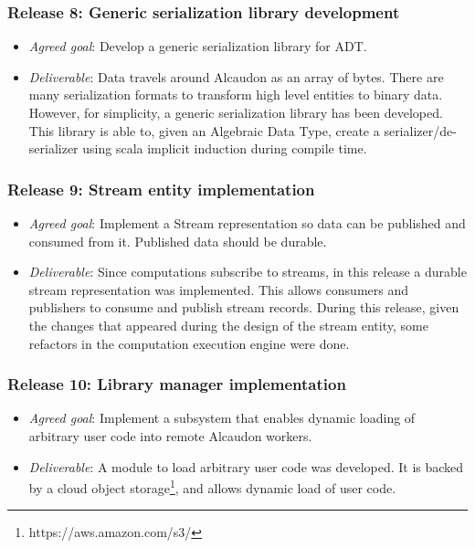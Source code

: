 \subsubsection{Release 8: Generic serialization library development}
\begin{itemize}
\item \textit{Agreed goal}: Develop a generic serialization library for \acf{ADT}.
\item \textit{Deliverable}: Data travels around Alcaudon as an array of bytes.
  There are many serialization formats to transform high level entities to
  binary data. However, for simplicity, a generic serialization library has been
  developed. This library is able to, given an Algebraic Data Type, create a
  serializer/de-serializer using scala implicit induction during compile time.
\end{itemize}

\subsubsection{Release 9: Stream entity implementation}
\begin{itemize}
\item \textit{Agreed goal}: Implement a Stream representation so data can be
  published and consumed from it. Published data should be durable.
\item \textit{Deliverable}: Since computations subscribe to streams, in this release a
  durable stream representation was implemented. This allows consumers and publishers to
  consume and publish stream records. During this release, given the changes
  that appeared during the design of the stream entity, some refactors in the
  computation execution engine were done.
\end{itemize}

\subsubsection{Release 10: Library manager implementation}
\begin{itemize}
\item \textit{Agreed goal}: Implement a subsystem that enables dynamic loading of
  arbitrary user code into remote Alcaudon workers.
\item \textit{Deliverable}: A module to load arbitrary user code was developed.
  It is backed by a cloud object storage\footnote{https://aws.amazon.com/s3/},
  and allows dynamic load of user code.
\end{itemize}

